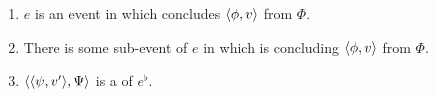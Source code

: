 \begin{note}
  \begin{definition}
    \begin{enumerate}[label=\arabic*., ref=(\arabic*), series=propRequWhyVSeries]
      \item
        \label{def:rCs:concludes}
        \(e\) is an event in which \vAgent{} concludes \(\langle \phi, v \rangle\) from \(\Phi\).
      \item
        \label{def:rCs:concluding}
        There is some sub-event of \(e\) in which \vAgent{} is concluding \(\langle \phi, v \rangle\) from \(\Phi\).
      \item
        \label{def:rCs:requ}
        \(\langle \langle \psi, v' \rangle, \Psi \rangle\) is a \requ{} of \(e^{\flat}\).
      \end{enumerate}
  \end{definition}
\end{note}


